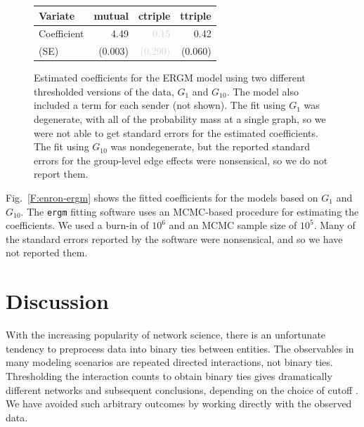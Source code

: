\documentclass[final]{statsoc}
\begin{document}
\begin{figure}
{\begin{tabular}{lrrr}
  \toprule
  Variate
  & \textbf{mutual}
  & \textbf{ctriple}
  & \textbf{ttriple}
  \\
  \midrule
  Coefficient
  & 4.49
  & \textcolor{LightGray}{0.15}
  & 0.42
  \\
  (SE)
  & \tiny{(0.003)}
  & \textcolor{LightGray}{\tiny{(0.290)}}
  & \tiny{(0.060)}
  \\
  \bottomrule
  \end{tabular}
}
\normalsize
\caption{Estimated coefficients for the ERGM model using two different
thresholded versions of the data, $G_1$ and $G_{10}$.  The model also included a
term for each sender (not shown).
The fit using $G_1$ was degenerate, with all of the probability mass at a
single graph, so we were not able to get standard errors for the estimated
coefficients.  The fit using $G_{10}$ was nondegenerate, but the reported 
standard errors for the group-level edge effects were nonsensical, so we do
not report them.
}
\end{figure}

Fig.~\ref{F:enron-ergm} shows the fitted coefficients for the models based on
$G_1$ and $G_{10}$.  The \texttt{ergm} fitting software uses an MCMC-based
procedure for estimating the coefficients.  We used a burn-in of $10^6$ and
an MCMC sample size of $10^5$.  Many of the standard errors reported by the
software were nonsensical, and so we have not reported them.  


\FloatBarrier

\section{Discussion}\label{S:discussion}

With the increasing popularity of network science, there is an unfortunate
tendency to preprocess data into binary ties between entities.
The observables in many modeling scenarios are repeated directed interactions,
not binary ties.  Thresholding the interaction counts to obtain binary ties
gives dramatically different networks and subsequent conclusions, depending on
the choice of cutoff \citep{dechoudhury2010}.  We have avoided such arbitrary
outcomes by working directly with the observed data.
\end{document}
